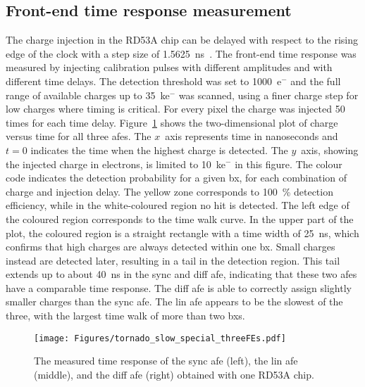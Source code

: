 \subsection*{Front-end time response measurement}

The charge injection in the RD53A chip can be delayed with respect to the rising edge of the clock with a step size of \SI{1.5625}{\nano\second}~\citep{rd53a_manual}. The front-end time response was measured by injecting calibration pulses with different amplitudes and with different time delays. The detection threshold was set to \num{1000}~e${^{-}}$ and the full range of available charges up to \num{35}~ke${^{-}}$ was scanned, using a finer charge step for low charges where timing is critical. For every pixel the charge was injected \num{50} times for each time delay. Figure~\ref{fig:3tor} shows the two-dimensional plot of charge versus time for all three \glspl{afe}. %
The \hbox{$x$ axis} represents time in nanoseconds and $t=0$ indicates the time when the highest charge is detected. The \hbox{$y$ axis}, showing the injected charge in electrons, is limited to \num{10}~ke${^{-}}$ in this figure. The colour code indicates the detection probability for a given \gls{bx}, for each combination of charge and injection delay. The yellow zone corresponds to \SI{100}{\percent} detection efficiency, while in the white-coloured region no hit is detected. The left edge of the coloured region corresponds to the time walk curve.
In the upper part of the plot, the coloured region is a straight rectangle with a time width of \SI{25}{\nano\second}, which confirms that high charges are always detected within one \gls{bx}. Small charges instead are detected later, resulting in a tail in the detection region. This tail extends up to about \SI{40}{\nano\second} in the \gls{sync} and \gls{diff} \gls{afe}, indicating that these two \glspl{afe} have a comparable time response. The \gls{diff} \gls{afe} is able to correctly assign slightly smaller charges than the \gls{sync} \gls{afe}. %
The \gls{lin} \gls{afe} appears to be the slowest of the three, with the largest time walk of more than two \glspl{bx}.

\begin{figure}[ht]
    \centering
    \texttt{[image: Figures/tornado\_slow\_special\_threeFEs.pdf]}
    \caption{The measured time response of the \gls{sync} \gls{afe} (left), the \gls{lin} \gls{afe} (middle), and the \gls{diff} \gls{afe} (right) obtained with one RD53A chip.}
    \label{fig:3tor}
\end{figure}



